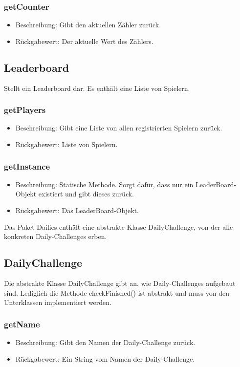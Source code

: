 \documentclass[a4paper]{scrreprt}
\begin{document}
   \subsubsection{getCounter}
   \begin{itemize}
   	\item Beschreibung: Gibt den aktuellen Zähler zurück.
   	\item Rückgabewert: Der aktuelle Wert des Zählers.
   \end{itemize}
   
   
   \subsection{Leaderboard}
   Stellt ein Leaderboard dar. Es enthält eine Liste von Spielern.
   
   \subsubsection{getPlayers}
   \begin{itemize}
   	\item Beschreibung: Gibt eine Liste von allen registrierten Spielern zurück.
   	\item Rückgabewert: Liste von Spielern.
   \end{itemize}
   \subsubsection{getInstance}
   \begin{itemize}
   	\item Beschreibung: Statische Methode. Sorgt dafür, dass nur ein LeaderBoard-Objekt existiert und gibt dieses zurück.
   	\item Rückgabewert: Das LeaderBoard-Objekt.
   \end{itemize}
   
   Das Paket Dailies enthält eine abstrakte Klasse DailyChallenge, von der alle konkreten Daily-Challenges erben.
   
   \subsection{DailyChallenge}
   Die abstrakte Klasse DailyChallenge gibt an, wie Daily-Challenges aufgebaut sind. Lediglich die Methode checkFinished() ist abstrakt und muss von den Unterklassen implementiert werden.
   \subsubsection{getName}
   \begin{itemize}
     \item Beschreibung: Gibt den Namen der Daily-Challenge zurück.
     \item Rückgabewert: Ein String vom Namen der Daily-Challenge.
    \end{itemize}
\end{document}
